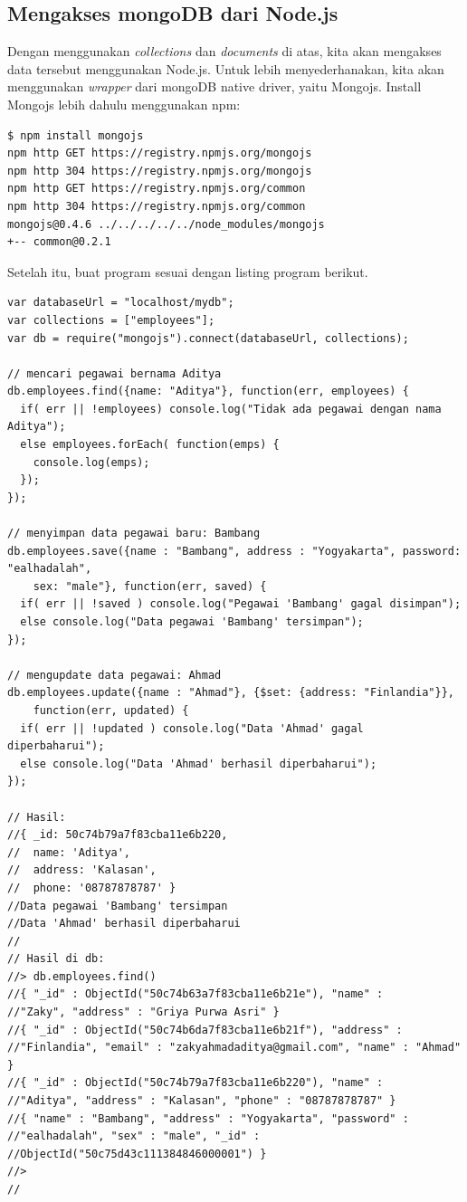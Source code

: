 \subsection{Mengakses mongoDB dari Node.js}

Dengan menggunakan \textit{collections} dan \textit{documents} di atas, kita akan mengakses data tersebut menggunakan Node.js. Untuk lebih menyederhanakan, kita akan menggunakan \textit{wrapper} dari mongoDB native driver, yaitu Mongojs. Install Mongojs lebih dahulu menggunakan npm:

\lstset{language=bash,caption=Instalasi driver mongoDB}
\begin{lstlisting}
$ npm install mongojs
npm http GET https://registry.npmjs.org/mongojs
npm http 304 https://registry.npmjs.org/mongojs
npm http GET https://registry.npmjs.org/common
npm http 304 https://registry.npmjs.org/common
mongojs@0.4.6 ../../../../../node_modules/mongojs
+-- common@0.2.1
\end{lstlisting}

Setelah itu, buat program sesuai dengan listing program berikut.

\lstset{language=bash,caption=Mengakses mongoDB dari Node.js}
\begin{lstlisting}
var databaseUrl = "localhost/mydb";
var collections = ["employees"];
var db = require("mongojs").connect(databaseUrl, collections);

// mencari pegawai bernama Aditya
db.employees.find({name: "Aditya"}, function(err, employees) {
  if( err || !employees) console.log("Tidak ada pegawai dengan nama Aditya");
  else employees.forEach( function(emps) {
    console.log(emps);
  });
});

// menyimpan data pegawai baru: Bambang
db.employees.save({name : "Bambang", address : "Yogyakarta", password: "ealhadalah", 
	sex: "male"}, function(err, saved) {
  if( err || !saved ) console.log("Pegawai 'Bambang' gagal disimpan");
  else console.log("Data pegawai 'Bambang' tersimpan");
});

// mengupdate data pegawai: Ahmad
db.employees.update({name : "Ahmad"}, {$set: {address: "Finlandia"}}, 
	function(err, updated) {
  if( err || !updated ) console.log("Data 'Ahmad' gagal diperbaharui");
  else console.log("Data 'Ahmad' berhasil diperbaharui");
});

// Hasil:
//{ _id: 50c74b79a7f83cba11e6b220,
//  name: 'Aditya',
//  address: 'Kalasan',
//  phone: '08787878787' }
//Data pegawai 'Bambang' tersimpan
//Data 'Ahmad' berhasil diperbaharui
//
// Hasil di db:
//> db.employees.find()
//{ "_id" : ObjectId("50c74b63a7f83cba11e6b21e"), "name" : 
//"Zaky", "address" : "Griya Purwa Asri" }
//{ "_id" : ObjectId("50c74b6da7f83cba11e6b21f"), "address" :
//"Finlandia", "email" : "zakyahmadaditya@gmail.com", "name" : "Ahmad" }
//{ "_id" : ObjectId("50c74b79a7f83cba11e6b220"), "name" :
//"Aditya", "address" : "Kalasan", "phone" : "08787878787" }
//{ "name" : "Bambang", "address" : "Yogyakarta", "password" : 
//"ealhadalah", "sex" : "male", "_id" : 
//ObjectId("50c75d43c111384846000001") }
//> 
//  
\end{lstlisting}

